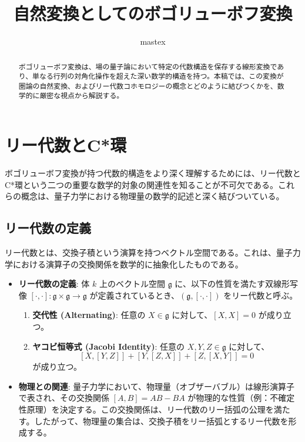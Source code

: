 \documentclass[uplatex,a4j,12pt,dvipdfmx]{jsarticle}
\title{
自然変換としてのボゴリューボフ変換
}
\author{
mastex
}
\begin{document}
\maketitle

\begin{abstract}
	ボゴリューボフ変換は、場の量子論において特定の代数構造を保存する線形変換であり、単なる行列の対角化操作を超えた深い数学的構造を持つ。本稿では、この変換が圏論の自然変換、およびリー代数コホモロジーの概念とどのように結びつくかを、数学的に厳密な視点から解説する。
\end{abstract}


\section{リー代数とC*環}

ボゴリューボフ変換が持つ代数的構造をより深く理解するためには、リー代数とC*環という二つの重要な数学的対象の関連性を知ることが不可欠である。これらの概念は、量子力学における物理量の数学的記述と深く結びついている。

\subsection{リー代数の定義}

リー代数とは、交換子積という演算を持つベクトル空間である。これは、量子力学における演算子の交換関係を数学的に抽象化したものである。

\begin{itemize}
	\item \textbf{リー代数の定義}:
	      体 $k$ 上のベクトル空間 $\mathfrak{g}$ に、以下の性質を満たす双線形写像 $[\cdot, \cdot]: \mathfrak{g} \times \mathfrak{g} \to \mathfrak{g}$ が定義されているとき、$(\mathfrak{g}, [\cdot, \cdot])$ をリー代数と呼ぶ。
	      \begin{enumerate}
		      \item \textbf{交代性 (Alternating)}: 任意の $X \in \mathfrak{g}$ に対して、$[X, X] = 0$ が成り立つ。
		      \item \textbf{ヤコビ恒等式 (Jacobi Identity)}: 任意の $X, Y, Z \in \mathfrak{g}$ に対して、
		            \[
			            [X, [Y, Z]] + [Y, [Z, X]] + [Z, [X, Y]] = 0
		            \]
		            が成り立つ。
	      \end{enumerate}
	\item \textbf{物理との関連}:
	      量子力学において、物理量（オブザーバブル）は線形演算子で表され、その交換関係 $[A, B] = AB - BA$ が物理的な性質（例：不確定性原理）を決定する。この交換関係は、リー代数のリー括弧の公理を満たす。したがって、物理量の集合は、交換子積をリー括弧とするリー代数を形成する。
\end{itemize}
\end{document}
